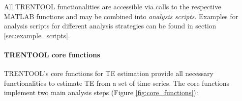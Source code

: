 \documentclass[a4paper,10pt]{article}
\begin{document}
All TRENTOOL functionalities are accessible via calls to the respective MATLAB functions and may be combined into \textit{analysis scripts}. Examples for analysis scripts for different analysis strategies can be found in section \ref{sec:example_scripts}. 



\paragraph*{TRENTOOL core functions} TRENTOOL's core functions for TE estimation provide all necessary functionalities to estimate TE from a set of time series. The core functions implement two main analysis steps (Figure \ref{fig:core_functions}):
\end{document}
